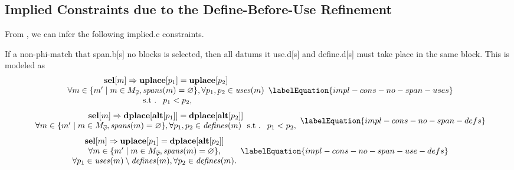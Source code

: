\subsection{Implied Constraints due to the Define-Before-Use Refinement}

From , we can infer the
following \gls{implied.c} \glspl{constraint}.

If a non-\gls{phi-match} that \gls{span.b}[s] no \glspl{block} is selected, then
all \glspl{datum} it \gls{use.d}[s] and \gls{define.d}[s] must take place in the
same \gls{block}.
%
This is modeled as
%
\begin{equation}
  \begin{array}{c}
    \mVar{sel}[m] \mImp \mVar{uplace}[p_1] = \mVar{uplace}[p_2] \\
    \forall m \in
      \mSetBuilder{m'}%
                  {%
                    m \in \mPhiMatchCompSet \hspace{-1pt},
                    \mSpans(m) = \mEmptySet
                  },
    \forall p_1, p_2 \in \mUses(m) \\
    \text{\st } p_1 < p_2,
  \end{array}
  \labelEquation{impl-cons-no-span-uses}
\end{equation}
%
\begin{equation}
  \begin{array}{c}
    \mVar{sel}[m]
    \mImp
    \mVar{dplace}[\mVar{alt}[p_1]] = \mVar{dplace}[\mVar{alt}[p_2]] \\
    \forall m \in
      \mSetBuilder{m'}%
                  {%
                    m \in \mPhiMatchCompSet \hspace{-1pt},
                    \mSpans(m) = \mEmptySet
                  },
    \forall p_1, p_2 \in \mDefines(m) \text{ \st } p_1 < p_2,
  \end{array}
  \labelEquation{impl-cons-no-span-defs}
\end{equation}
%
\begin{equation}
  \begin{array}{c}
    \mVar{sel}[m]
    \mImp
    \mVar{uplace}[p_1] = \mVar{dplace}[\mVar{alt}[p_2]] \\
    \forall m \in
      \mSetBuilder{m'}%
                  {%
                    m \in \mPhiMatchCompSet \hspace{-1pt},
                    \mSpans(m) = \mEmptySet
                  }, \\
    \forall p_1 \in \mUses(m) \setminus \mDefines(m),
    \forall p_2 \in \mDefines(m).
  \end{array}
  \labelEquation{impl-cons-no-span-use-defs}
\end{equation}

